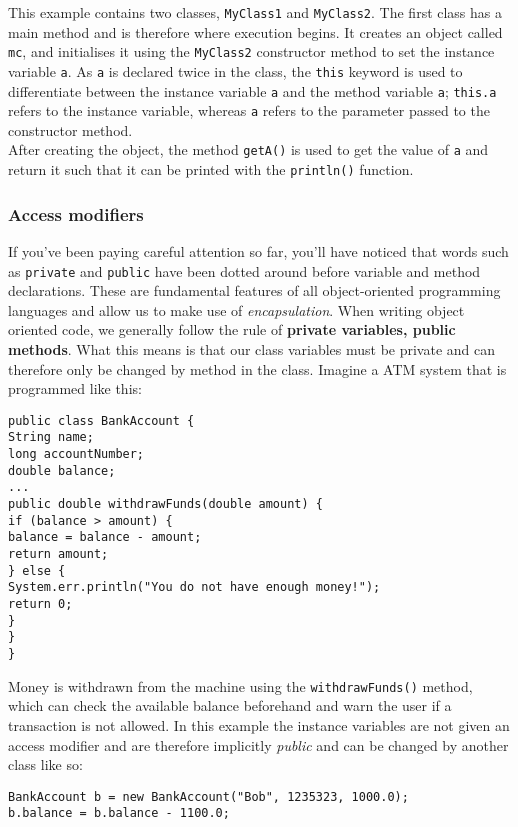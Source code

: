 \noindent
This example contains two classes, {\tt MyClass1} and {\tt MyClass2}. The first class has a main method and is therefore where execution begins. It creates an object called {\tt mc}, and initialises it using the {\tt MyClass2} constructor method to set the instance variable {\tt a}. As {\tt a} is declared twice in the class, the {\tt this} keyword is used to differentiate between the instance variable {\tt a} and the method variable {\tt a}; {\tt this.a} refers to the instance variable, whereas {\tt a} refers to the parameter passed to the constructor method.\\

\noindent
After creating the object, the method {\tt getA()} is used to get the value of {\tt a} and return it such that it can be printed with the {\tt println()} function.

\subsubsection*{Access modifiers}

If you've been paying careful attention so far, you'll have noticed that words such as {\tt private} and {\tt public} have been dotted around before variable and method declarations. These are fundamental features of all object-oriented programming languages and allow us to make use of \emph{encapsulation}. When writing object oriented code, we generally follow the rule of {\bf private variables, public methods}. What this means is that our class variables must be private and can therefore only be changed by method in the class. Imagine a ATM system that is programmed like this:

\begin{verbatim}
public class BankAccount {
String name;
long accountNumber;
double balance;
...
public double withdrawFunds(double amount) {
if (balance > amount) {
balance = balance - amount;
return amount;
} else {
System.err.println("You do not have enough money!");
return 0;
}
}
}
\end{verbatim}

\noindent
Money is withdrawn from the machine using the {\tt withdrawFunds()} method, which can check the available balance beforehand and warn the user if a transaction is not allowed. In this example the instance variables are not given an access modifier and are therefore implicitly \emph{public} and can be changed by another class like so:

\begin{verbatim}
BankAccount b = new BankAccount("Bob", 1235323, 1000.0);
b.balance = b.balance - 1100.0;
\end{verbatim}

